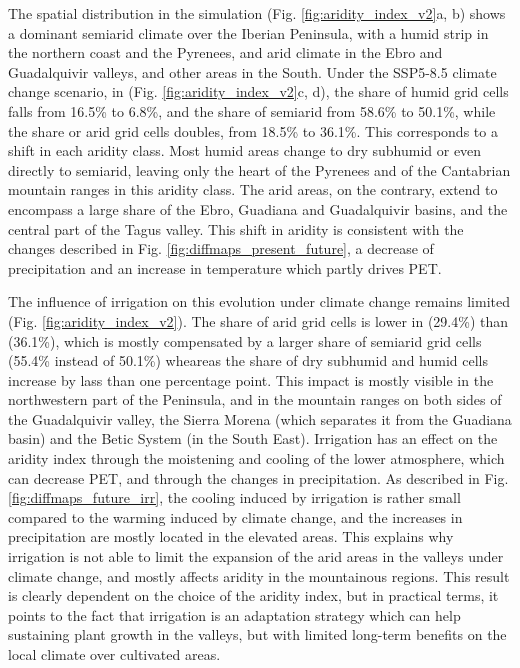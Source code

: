 The spatial distribution in the \presnoirr simulation (Fig. \ref{fig:aridity_index_v2}a, b) shows a dominant semiarid climate over the Iberian Peninsula, with a humid strip in the northern coast and the Pyrenees, and arid climate in the Ebro and Guadalquivir valleys, and other areas in the South.
Under the SSP5-8.5 climate change scenario, in \futnoirr (Fig. \ref{fig:aridity_index_v2}c, d), the share of humid grid cells falls from 16.5\% to 6.8\%, and the share of semiarid from 58.6\% to 50.1\%, while the share or arid grid cells doubles, from 18.5\% to 36.1\%. This corresponds to a shift in each aridity class. Most humid areas change to dry subhumid or even directly to semiarid, leaving only the heart of the Pyrenees and of the Cantabrian mountain ranges in this aridity class. The arid areas, on the contrary, extend to encompass a large share of the Ebro, Guadiana and Guadalquivir basins, and the central part of the Tagus valley. This shift in aridity is consistent with the changes described in Fig. \ref{fig:diffmaps_present_future}, a decrease of precipitation and an increase in temperature which partly drives PET. %

The influence of irrigation on this evolution under climate change remains limited (Fig. \ref{fig:aridity_index_v2}). The share of arid grid cells is lower in \futirr (29.4\%) than \futnoirr (36.1\%), which is mostly compensated by a larger share of semiarid grid cells (55.4\% instead of 50.1\%) wheareas the share of dry subhumid and humid cells increase by lass than one percentage point.
This impact is mostly visible in the northwestern part of the Peninsula, and in the mountain ranges on both sides of the Guadalquivir valley, the Sierra Morena (which separates it from the Guadiana basin) and the Betic System (in the South East). Irrigation has an effect on the aridity index through the moistening and cooling of the lower atmosphere, which can decrease PET, and through the changes in precipitation. As described in Fig. \ref{fig:diffmaps_future_irr}, the cooling induced by irrigation is rather small compared to the warming induced by climate change, and the increases in precipitation are mostly located in the elevated areas. This explains why irrigation is not able to limit the expansion of the arid areas in the valleys under climate change, and mostly affects aridity in the mountainous regions. This result is clearly dependent on the choice of the aridity index, but in practical terms, it points to the fact that irrigation is an adaptation strategy which can help sustaining plant growth in the valleys, but with limited long-term benefits on the local climate over cultivated areas.

